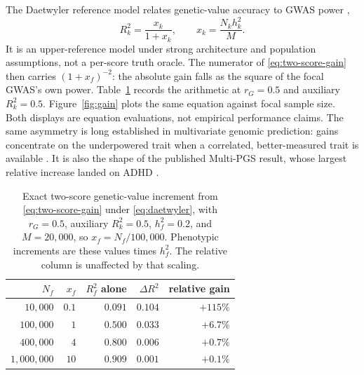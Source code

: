 \documentclass[11pt,a4paper]{article}
\begin{document}
The Daetwyler reference model relates genetic-value accuracy to
GWAS power \cite{daetwyler2008},
\begin{equation}
  R_k^2=\frac{x_k}{1+x_k},
  \qquad
  x_k=\frac{N_k h_k^2}{M}.
  \label{eq:daetwyler}
\end{equation}
It is an upper-reference model under strong architecture and
population assumptions, not a per-score truth oracle. The
numerator of \eqref{eq:two-score-gain} then carries
\((1+x_f)^{-2}\): the absolute gain falls as the square of the
focal GWAS's own power. Table~\ref{tab:gain} records the
arithmetic at \(r_G=0.5\) and auxiliary \(R_k^2=0.5\).
Figure~\ref{fig:gain} plots the same equation against focal
sample size. Both displays are equation evaluations, not
empirical performance claims. The same asymmetry is long
established in multivariate genomic prediction: gains
concentrate on the underpowered trait when a correlated,
better-measured trait is available \cite{jia2012}. It is also
the shape of the published Multi-PGS result, whose largest
relative increase landed on ADHD \cite{albinana2023}.

\begin{table}[ht]
\centering
\caption{Exact two-score genetic-value increment from
  \eqref{eq:two-score-gain} under \eqref{eq:daetwyler}, with
  \(r_G=0.5\), auxiliary \(R_k^2=0.5\), \(h_f^2=0.2\), and
  \(M=20{,}000\), so \(x_f=N_f/100{,}000\). Phenotypic
  increments are these values times \(h_f^2\). The relative
  column is unaffected by that scaling.}
\label{tab:gain}
\small
\begin{tabular}{@{}rrrrr@{}}
\toprule
\(N_f\) & \(x_f\) & \(R_f^2\) alone & \(\Delta R^2\) &
relative gain \\
\midrule
\(10{,}000\) & \(0.1\) & \(0.091\) & \(0.104\) & \(+115\%\) \\
\(100{,}000\) & \(1\) & \(0.500\) & \(0.033\) & \(+6.7\%\) \\
\(400{,}000\) & \(4\) & \(0.800\) & \(0.006\) & \(+0.7\%\) \\
\(1{,}000{,}000\) & \(10\) & \(0.909\) & \(0.001\) & \(+0.1\%\) \\
\bottomrule
\end{tabular}
\end{table}
\end{document}
